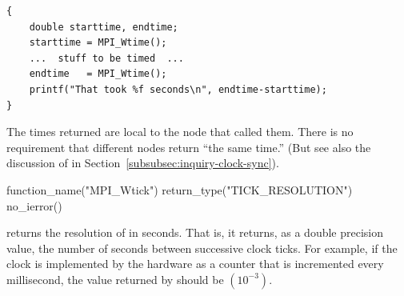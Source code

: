 \begin{example}
%
\begin{lstlisting}[language={[MPI]C}]
{
    double starttime, endtime;
    starttime = MPI_Wtime();
    ...  stuff to be timed  ...
    endtime   = MPI_Wtime();
    printf("That took %f seconds\n", endtime-starttime);
}
\end{lstlisting}
\end{example}

The times returned are local to the node that called them.
There is no requirement that different nodes return ``the same time.''
(But see also the discussion of
 in Section~\ref{subsubsec:inquiry-clock-sync}).

\begin{mpi-binding}
    function_name("MPI_Wtick")
    return_type("TICK_RESOLUTION")
    no_ierror()
\end{mpi-binding}

 returns the resolution of
 in seconds.  That is, it
returns, as a double precision value, the number of seconds between successive
clock ticks.
For example, if the clock is implemented by the hardware as a counter that is
incremented every millisecond, the value returned by 
should be $(10^{-3})$.
